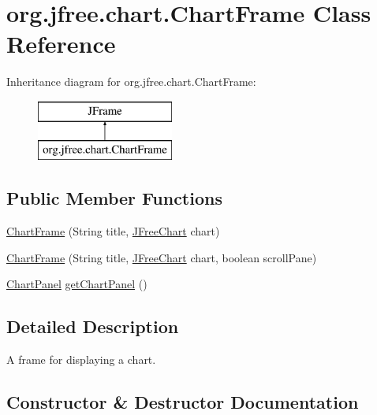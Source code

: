 \hypertarget{classorg_1_1jfree_1_1chart_1_1_chart_frame}{}\section{org.\+jfree.\+chart.\+Chart\+Frame Class Reference}
\label{classorg_1_1jfree_1_1chart_1_1_chart_frame}
Inheritance diagram for org.\+jfree.\+chart.\+Chart\+Frame\+:\begin{figure}[H]
\begin{center}
\leavevmode
\includegraphics[height=2.000000cm]{classorg_1_1jfree_1_1chart_1_1_chart_frame}
\end{center}
\end{figure}
\subsection*{Public Member Functions}
\begin{DoxyCompactItemize}
\item 
\mbox{\hyperlink{classorg_1_1jfree_1_1chart_1_1_chart_frame_a2ee9e549b2d47ebfe1331a5d31109f43}{Chart\+Frame}} (String title, \mbox{\hyperlink{classorg_1_1jfree_1_1chart_1_1_j_free_chart}{J\+Free\+Chart}} chart)
\item 
\mbox{\hyperlink{classorg_1_1jfree_1_1chart_1_1_chart_frame_a7828262795b485e3a2b8c9f040f9bbce}{Chart\+Frame}} (String title, \mbox{\hyperlink{classorg_1_1jfree_1_1chart_1_1_j_free_chart}{J\+Free\+Chart}} chart, boolean scroll\+Pane)
\item 
\mbox{\hyperlink{classorg_1_1jfree_1_1chart_1_1_chart_panel}{Chart\+Panel}} \mbox{\hyperlink{classorg_1_1jfree_1_1chart_1_1_chart_frame_aedcf8c3c29dcb699483f23bd0be94605}{get\+Chart\+Panel}} ()
\end{DoxyCompactItemize}


\subsection{Detailed Description}
A frame for displaying a chart. 

\subsection{Constructor \& Destructor Documentation}
\mbox{\label{classorg_1_1jfree_1_1chart_1_1_chart_frame_a2ee9e549b2d47ebfe1331a5d31109f43}} 
